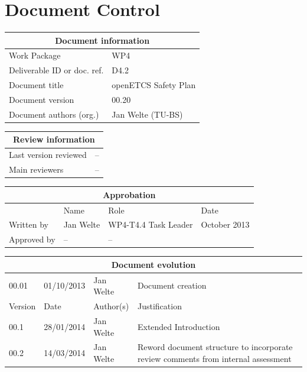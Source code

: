 \documentclass{template/openetcs_report}
\begin{document}
\maketitle
\tableofcontents
\listoffiguresandtables
\newpage

\chapter{Document Control}

\begin{tabular}{|p{4.4cm}|p{8.7cm}|}
\hline
\multicolumn{2}{|c|}{Document information} \\
\hline
Work Package &  WP4  \\
Deliverable ID or doc. ref. & D4.2\\
\hline
Document title & openETCS Safety Plan\\
Document version & 00.20 \\
Document authors (org.)  & Jan Welte (TU-BS)\\
\hline
\end{tabular}

\begin{tabular}{|p{4.4cm}|p{8.7cm}|}
\hline
\multicolumn{2}{|c|}{Review information} \\
\hline
Last version reviewed & -- \\
\hline
Main reviewers & -- \\
\hline
\end{tabular}

\begin{tabular}{|p{2.2cm}|p{4cm}|p{4cm}|p{2cm}|}
\hline
\multicolumn{4}{|c|}{Approbation} \\
\hline
  &  Name & Role & Date   \\
\hline  
Written by    &  Jan Welte & WP4-T4.4 Task Leader  &  October 2013\\
\hline
Approved by & -- & -- & \\
\hline
\end{tabular}

\begin{tabular}{|p{2.2cm}|p{2cm}|p{3cm}|p{5cm}|}
\hline
\multicolumn{4}{|c|}{Document evolution} \\
\hline
00.01 & 01/10/2013 & Jan Welte &  Document creation \\
\hline
Version &  Date & Author(s) & Justification  \\
\hline  
00.1 & 28/01/2014 & Jan Welte &  Extended Introduction  \\
00.2 & 14/03/2014 & Jan Welte &  Reword document structure to incorporate review comments from internal assessment \\
\hline  
\end{tabular}
\newpage
\end{document}
